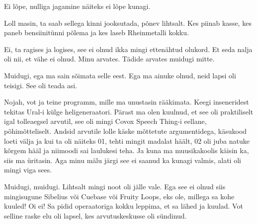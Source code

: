 
Ei lõpe, nulliga jagamine näiteks ei lõpe kunagi. 


Loll masin, ta saab sellega kinni jooksutada, põnev lihtsalt. Kes piinab kasse, kes  paneb bensiinitünni põlema ja kes laseb Rheinmetalli kokku.


Ei, ta ragises ja logises, see ei olnud ikka mingi ettenähtud olukord. Et seda nalja oli nii, et vähe ei olnud. Minu arvates. Tädide arvates muidugi mitte. 


Muidugi, ega ma sain sõimata selle eest. Ega ma ainuke olnud,  neid lapsi oli teisigi. See oli teada asi.

Nojah, vot ja teine programm, mille ma unustasin rääkimata. Keegi inseneridest tekitas Ural-i  külge heligeneraatori. Pärast ma olen kuulnud, et see oli praktiliselt igal tolleaegsel arvutil, see oli mingi Covox Speech Thing-i eellane, põhimõtteliselt. Andsid arvutile lolle käske mõttetute argumentidega, käsukood loeti välja ja kui ta oli näiteks 01, tehti mingit madalat häält, 02 oli juba natuke kõrgem hääl ja  niimoodi sai laulukesi teha. Ja kuna ma muusikakoolis käisin ka, siis ma üritasin. Aga minu mälu järgi see ei saanud ka kunagi valmis, alati oli mingi viga sees. 


Muidugi, muidugi. Lihtsalt mingi noot oli jälle vale. Ega see ei olnud siis mingisugune Sibelius või Cuebase või Fruity Loops, eks ole, millega sa kohe kuuled! Oi ei! Sa pidid   operaatoriga kokku leppima, et sa lähed ja kuulad. Vot selline raske elu oli lapsel, kes arvutuskeskusse oli sündinud. 


